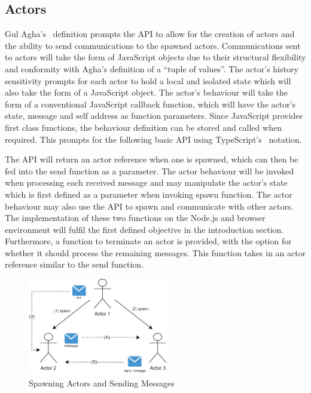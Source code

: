 \documentclass[lettersize,journal]{IEEEtran}
\begin{document}
\subsection{Actors}
Gul Agha's~\cite{agha1985actors} definition prompts the API to allow for the creation of actors and the ability to send communications to the spawned actors. Communications sent to actors will take the form of JavaScript objects due to their structural flexibility and conformity with Agha's definition of a “tuple of values”. The actor's history sensitivity prompts for each actor to hold a local and isolated state which will also take the form of a JavaScript object. The actor's behaviour will take the form of a conventional JavaScript callback function, which will have the actor's state, message and self address as function parameters. Since JavaScript provides first class functions, the behaviour definition can be stored and called when required. This prompts for the following basic API using TypeScript's~\cite{typescript} notation.

The API will return an actor reference when one is spawned, which can then be fed into the send function as a parameter. The actor behaviour will be invoked when processing each received message and may manipulate the actor's state which is first defined as a parameter when invoking spawn function. The actor behaviour may also use the API to spawn and communicate with other actors. The implementation of these two functions on the Node.js and browser environment will fulfil the first defined objective in the introduction section. Furthermore, 
a function to terminate an actor is provided, with the option for whether it should process the remaining messages. This function takes in an actor reference similar to the send function.
\begin{figure}[H]
    \begin{centering}
        \includegraphics[width=230px]{resources/actors.png}
        \caption{Spawning Actors and Sending Messages}
    \end{centering}
\end{figure}
\end{document}
